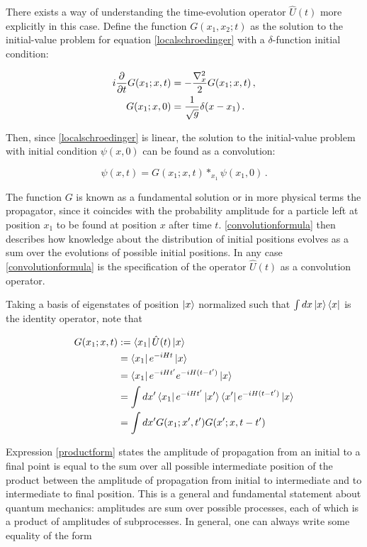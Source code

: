 \documentclass{article}
\begin{document}
There exists a way of understanding the time-evolution operator $\hat U(t)$ more explicitly in this case. Define the function $G(x_1,x_2;t)$ as the solution to the initial-value problem for equation \eqref{localschroedinger} with a $\delta$-function initial condition:

\begin{align*}
    i \pdv{t} G(x_1;x,t) & = - \frac{\nabla^2_x}{2} G(x_1;x,t)\,, \\
    G(x_1;x,0) & = \frac{1}{\sqrt{g}} \delta(x-x_1)\,.
\end{align*}

Then, since \eqref{localschroedinger} is linear, the solution to the initial-value problem with initial condition $\psi(x,0)$ can be found as a convolution:

\begin{equation}\label{convolutionformula}
    \psi(x,t) = G(x_1;x,t) \ast_{x_1} \psi(x_1,0)\,.
\end{equation}

The function $G$ is known as a fundamental solution or in more physical terms the propagator, since it coincides with the probability amplitude for a particle left at position $x_1$ to be found at position $x$ after time $t$. \eqref{convolutionformula} then describes how knowledge about the distribution of initial positions evolves as a sum over the evolutions of possible initial positions. In any case \eqref{convolutionformula} is the specification of the operator $\hat U(t)$ as a convolution operator.

Taking a basis of eigenstates of position $\ket x$ normalized such that $\int dx \ket{x} \bra{x}$ is the identity operator, note that

\begin{align}
    G(x_1;x,t) & := \bra{x_1} \hat U (t) \ket{x} \nonumber \\
    & = \bra{x_1} e^{-i H t} \ket{x} \nonumber \\
    & = \bra{x_1} e^{-i H t'} e^{-i H (t-t')} \ket{x} \nonumber \\
    & = \int dx' \bra{x_1} e^{-i H t'} \ket{x'} \bra{x'} e^{-iH(t-t')} \ket{x} \nonumber\\
    & = \int dx' G(x_1;x',t')G(x';x,t-t') \label{productform}
\end{align}

Expression \eqref{productform} states the amplitude of propagation from an initial to a final point is equal to the sum over all possible intermediate position of the product between the amplitude of propagation from initial to intermediate and to intermediate to final position. This is a general and fundamental statement about quantum mechanics: amplitudes are sum over possible processes, each of which is a product of amplitudes of subprocesses. In general, one can always write some equality of the form
\end{document}
